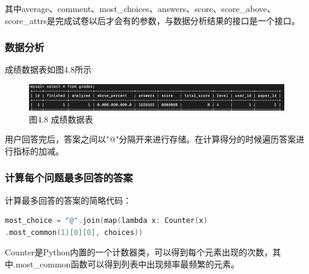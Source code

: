 其中average、comment、most\_choices、answers、score、score\_above、score\_attrs是完成试卷以后才会有的参数，与数据分析结果的接口是一个接口。

\subsubsection{数据分析}

成绩数据表如图4.8所示

\begin{figure}[thbp!]
	\centering
	\includegraphics[width=1.0\linewidth]{figure/grade}
	\label{fig:grade} \\
		图4.8 成绩数据表
\end{figure}

用户回答完后，答案之间以"@"分隔开来进行存储。在计算得分的时候遍历答案进行指标的加减。

\subsubsection{计算每个问题最多回答的答案}

计算最多回答的答案的简略代码：

\begin{lstlisting}[language=C]
most_choice = "@".join(map(lambda x: Counter(x)
.most_common(1)[0][0], choices))
\end{lstlisting}

Counter是Python内置的一个计数器类，可以得到每个元素出现的次数，其中.most\_common函数可以得到列表中出现频率最频繁的元素。
